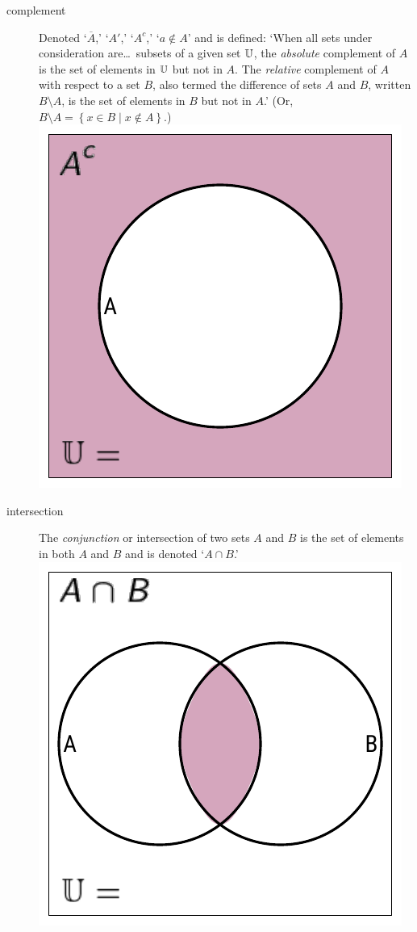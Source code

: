 \documentclass[11pt]{article}%
\begin{document}
\begin{multicols}{2}
\begin{description}
\item[complement] Denoted `$\overline{A}$,' `$A'$,' `$A^c$,' `$a \notin A$' and is defined: `When all sets under consideration are\dots\ subsets of a given set $\mathbb{U}$, the \textit{absolute} complement of $A$ is the set of elements in $\mathbb{U}$ but not in $A$. The \textit{relative} complement of $A$ with respect to a set $B$, also termed the difference of sets $A$ and $B$, written $B \setminus A$, is the set of elements in $B$ but not in $A$.' \parencite{wiki:complement-set-theory} (Or, $B \setminus A = \left\{ x \in B \mid x \notin A \right\}$.) \includegraphics*[scale = 0.75]{../../images/venn-complement.pdf}

\item[intersection] The \textit{conjunction} or intersection of two sets $A$ and $B$ is the set of elements in both $A$ and $B$ and is denoted `$A \cap B$.' \includegraphics*[scale = 0.75]{../../images/venn-2-and.pdf}


\end{description}
\end{multicols}
\end{document}
